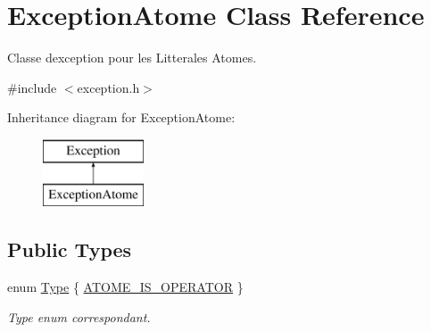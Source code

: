 \hypertarget{class_exception_atome}{}\section{Exception\+Atome Class Reference}
\label{class_exception_atome}


Classe d\textquotesingle{}exception pour les Litterales Atomes.  




{\ttfamily \#include $<$exception.\+h$>$}

Inheritance diagram for Exception\+Atome\+:\begin{figure}[H]
\begin{center}
\leavevmode
\includegraphics[height=2.000000cm]{class_exception_atome}
\end{center}
\end{figure}
\subsection*{Public Types}
\begin{DoxyCompactItemize}
\item 
enum \hyperlink{class_exception_atome_abb43c6c9a48f745dba9aaad0f721267d}{Type} \{ \hyperlink{class_exception_atome_abb43c6c9a48f745dba9aaad0f721267dafabbf1b0aaefd3fc099f9cecb11b1888}{A\+T\+O\+M\+E\+\_\+\+I\+S\+\_\+\+O\+P\+E\+R\+A\+T\+OR}
 \}\begin{DoxyCompactList}\small\item\em Type enum correspondant. \end{DoxyCompactList}
\end{DoxyCompactItemize}
